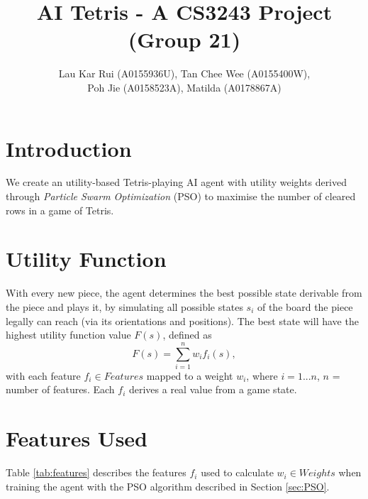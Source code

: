 \documentclass[12pt]{article}
\title{\vspace{-2.5em}AI Tetris - A CS3243 Project (Group 21)}
\author{Lau Kar Rui (A0155936U), Tan Chee Wee (A0155400W), 
\\Poh Jie (A0158523A), Matilda (A0178867A)}
\date{}
\numberwithin{table}{section}
\numberwithin{figure}{section}
\begin{document}
 
\baselineskip15.0pt
\setlength{\parskip}{0.3em}
\linespread{1.0}
\maketitle 

\section{Introduction}

We create an utility-based Tetris-playing AI agent with utility weights derived through \emph{Particle Swarm Optimization} (PSO) to maximise the number of cleared rows in a game of Tetris. 

	
\section{Utility Function}\label{eq:util-fx}
With every new piece, the agent determines the best possible state derivable from the piece and plays it, by simulating all possible states $s_i$ of the board the piece legally can reach (via its orientations and positions). The best state will have the highest utility function value $F(s)$, defined as
	$$F(s) = \sum_{i = 1}^{n} w_if_i(s),$$
with each feature $f_i \in Features$ mapped to a weight $w_i$, where $i = 1...n$, $n$ = number of features. Each $f_i$ derives a real value from a game state. 

\section{Features Used} \label{sec:features}
Table \ref{tab:features} describes the features $f_i$ used to calculate $w_i \in Weights$ when training the agent with the PSO algorithm described in Section \ref{sec:PSO}. 
\end{document}
